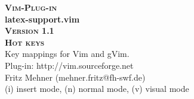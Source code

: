 \documentclass[oneside,10pt,landscape,DIV17]{scrartcl}
\newcommand{\Pluginversion}{1.1}
\begin{document}
\begin{multicols}{3}
\begin{center}
%
\textbf{\textsc{\small{Vim-Plug-in}}}\\
\textbf{\LARGE{latex-support.vim}}\\
\textbf{\textsc{\small{Version \Pluginversion}}}\\
\vspace{5mm}%
\textbf{\textsc{\Huge{Hot keys}}}\\ 
\vspace{5mm}%
Key mappings for Vim and gVim.\\
Plug-in: http://vim.sourceforge.net\\
Fritz Mehner (mehner.fritz@fh-swf.de)\\
\vspace{1.0mm}
{\normalsize (i)} insert mode, {\normalsize (n)} normal mode, {\normalsize (v)} visual mode\\
\vspace{4.0mm}


\end{center}
\end{multicols}
\end{document}
